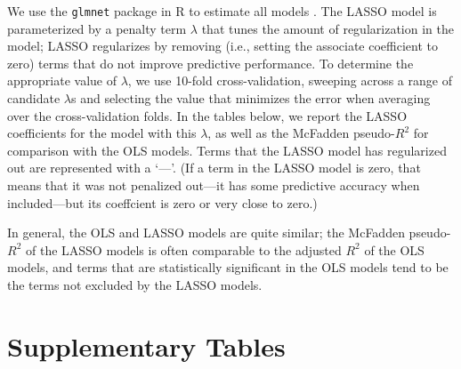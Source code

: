 \documentclass[10pt,landscape]{article}
\begin{document}
We use the \texttt{glmnet} package in R to estimate all models \parencite{simon_regularization_2011}. 
The LASSO model is parameterized by a penalty term \(\lambda\) that tunes the amount of regularization in the model; LASSO regularizes by removing (i.e., setting the associate coefficient to zero) terms that do not improve predictive performance.
To determine the appropriate value of \(\lambda\), we use 10-fold cross-validation, sweeping across a range of candidate \(\lambda\)s and selecting the value that minimizes the error when averaging over the cross-validation folds.
In the tables below, we report the LASSO coefficients for the model with this \(\lambda\), as well as the McFadden pseudo-\(R^2\) for comparison with the OLS models.
Terms that the LASSO model has regularized out are represented with a `---'. 
(If a term in the LASSO model is zero, that means that it was not penalized out---it has some predictive accuracy when included---but its coeffcient is zero or very close to zero.)

In general, the OLS and LASSO models are quite similar; the McFadden pseudo-\(R^2\) of the LASSO models is often comparable to the adjusted \(R^2\) of the OLS models, and terms that are statistically significant in the OLS models tend to be the terms not excluded by the LASSO models. 
\clearpage


\section{Supplementary Tables}


\clearpage


\clearpage


\clearpage


\clearpage


\clearpage


\clearpage


\clearpage


\clearpage


% 
\end{document}
